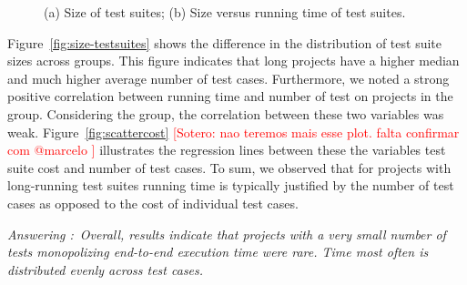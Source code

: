 \documentclass[10pt,journal,compsoc]{IEEEtran}
\begin{document}
\begin{figure}[t!]%
  \centering
  \qquad
  \vspace{-2mm}
  \caption{\label{fig:time-versus-size}(a) Size of test suites; (b)
    Size versus running time of test suites.}%
  \vspace{-5mm}
\end{figure}

Figure~\ref{fig:size-testsuites} shows the difference in the
distribution of test suite sizes across groups.  This figure indicates
that long projects have a higher median and much higher average number of test cases.
Furthermore, we noted a strong positive correlation between running
time and number of test on projects in the \longg{} group.
Considering the \medg{} group, the correlation between these two
variables was weak.
Figure~\ref{fig:scattercost} \textcolor{red}{[Sotero:  nao teremos mais esse plot. falta confirmar com @marcelo ]} illustrates the regression lines between
these the variables test suite cost and number of test cases.
To sum, we observed that for projects with long-running test suites
running time is typically
justified by the number of test cases as opposed to the cost of individual test cases.

\begin{mdframed}
  \noindent\textit{Answering \numRQFeasibilityTwo{}:}~\emph{Overall, results indicate that
  projects with a very small number of tests monopolizing end-to-end
  execution time were rare. Time most often is distributed evenly
  across test cases.}
\end{mdframed}
\end{document}
